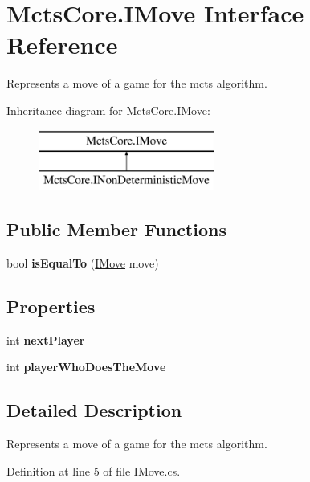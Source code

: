 \hypertarget{interface_mcts_core_1_1_i_move}{}\section{Mcts\+Core.\+I\+Move Interface Reference}
\label{interface_mcts_core_1_1_i_move}


Represents a move of a game for the mcts algorithm.  


Inheritance diagram for Mcts\+Core.\+I\+Move\+:\begin{figure}[H]
\begin{center}
\leavevmode
\includegraphics[height=2.000000cm]{interface_mcts_core_1_1_i_move}
\end{center}
\end{figure}
\subsection*{Public Member Functions}
\begin{DoxyCompactItemize}
\item 
\mbox{\label{interface_mcts_core_1_1_i_move_a50974d40230b5da8a75bee6f4c9efda2}} 
bool {\bfseries is\+Equal\+To} (\mbox{\hyperlink{interface_mcts_core_1_1_i_move}{I\+Move}} move)
\end{DoxyCompactItemize}
\subsection*{Properties}
\begin{DoxyCompactItemize}
\item 
\mbox{\label{interface_mcts_core_1_1_i_move_aad81f4a0263011457c6c78a3886171cd}} 
int {\bfseries next\+Player}
\item 
\mbox{\label{interface_mcts_core_1_1_i_move_a06f1d55f83bd7652cc3093c875f74e4c}} 
int {\bfseries player\+Who\+Does\+The\+Move}
\end{DoxyCompactItemize}


\subsection{Detailed Description}
Represents a move of a game for the mcts algorithm. 



Definition at line 5 of file I\+Move.\+cs.

